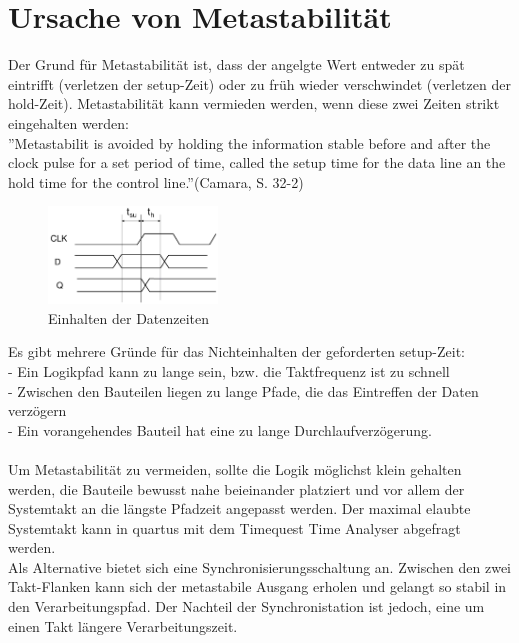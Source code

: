 \section{Ursache von Metastabilität}\label{sect.meatastabil_ursache}
Der Grund für Metastabilität ist, dass der angelgte Wert entweder zu spät eintrifft (verletzen der setup-Zeit) oder zu früh wieder verschwindet (verletzen der hold-Zeit). Metastabilität kann vermieden werden, wenn diese zwei Zeiten strikt eingehalten werden:\\
\newline
''Metastabilit is avoided by holding the information stable before and after the clock pulse  for a set period of time, called the setup time for the data line an the hold time for the control line.''(Camara, S. 32-2)
\begin{figure}[H]
	\centering
	\includegraphics[width=0.4\textwidth]{images/metastability/kritscheZeit_FF.png}
	\caption{Einhalten der Datenzeiten}
	\label{fig.metastabil.kritisches_zeitfenster}
\end{figure}
Es gibt mehrere Gründe für das Nichteinhalten der geforderten setup-Zeit:\\
- Ein Logikpfad kann zu lange sein, bzw. die Taktfrequenz ist zu schnell\\
- Zwischen den Bauteilen liegen zu lange Pfade, die das Eintreffen der Daten verzögern\\
- Ein vorangehendes Bauteil hat eine zu lange Durchlaufverzögerung.\\
\\
Um Metastabilität zu vermeiden, sollte die Logik möglichst klein gehalten werden, die Bauteile bewusst nahe beieinander platziert und vor allem der Systemtakt an die längste Pfadzeit angepasst werden. Der maximal elaubte Systemtakt kann in quartus mit dem Timequest Time Analyser abgefragt werden.\\
Als Alternative bietet sich eine Synchronisierungsschaltung an. Zwischen den zwei Takt-Flanken kann sich der metastabile Ausgang erholen und gelangt so stabil in den Verarbeitungspfad. Der Nachteil der Synchronistation ist jedoch, eine um einen Takt längere Verarbeitungszeit.\\


